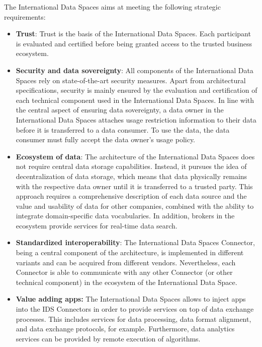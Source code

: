 

The International Data Spaces aims at meeting the following strategic requirements:


\begin{itemize}
	\item \textbf{Trust}: Trust is the basis of the International Data Spaces. Each participant is evaluated and certified before being granted access to the trusted business ecosystem.

	\item \textbf{Security and data sovereignty}: All components of the International Data Spaces rely on state-of-the-art security measures. Apart from architectural specifications, security is mainly ensured by the evaluation and certification of each technical component used in the International Data Spaces. In line with the central aspect of ensuring data sovereignty, a data owner in the International Data Spaces attaches usage restriction information to their data before it is transferred to a data consumer. To use the data, the data consumer must fully accept the data owner’s usage policy.

	\item \textbf{Ecosystem of data}: The architecture of the International Data Spaces does not require central data storage capabilities. Instead, it pursues the idea of decentralization of data storage, which means that data physically remains with the respective data owner until it is transferred to a trusted party. This approach requires a comprehensive description of each data source and the value and usability of data for other companies, combined with the ability to integrate domain-specific data vocabularies. In addition, brokers in the ecosystem provide services for real-time data search.

	\item \textbf{Standardized interoperability}: The International Data Spaces Connector, being a central component of the architecture, is implemented in different variants and can be acquired from different vendors. Nevertheless, each Connector is able to communicate with any other Connector (or other technical component) in the ecosystem of the International Data Space.

	\item \textbf{Value adding apps:} The International Data Spaces allows to inject apps into the IDS Connectors in order to provide services on top of data exchange processes. This includes services for data processing, data format alignment, and data exchange protocols, for example. Furthermore, data analytics services can be provided by remote execution of algorithms.


\end{itemize}
